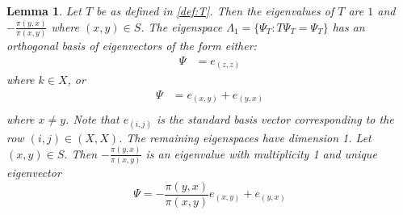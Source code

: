 \documentclass{amsart}
\newtheorem{lemma}[definition]{Lemma}
\newcommand{\1}{\mathbbm{1}}
\begin{document}
\begin{lemma}\label{lem:eigen}
    Let $T$ be as defined in \ref{def:T}. Then the eigenvalues of $T$ are $1$ and $-\frac{\pi(y,x)}{\pi(x,y)}$ where $(x,y)\in S$. The eigenspace $\Lambda_1=\{\Psi_T: T\Psi_T=\Psi_T\}$ has an orthogonal basis of eigenvectors of the form either:
    \begin{align*}
        \Psi &= e_{(z,z)}
    \end{align*}
    where $k\in X$, or 
    \begin{align*}
        \Psi &= e_{(x,y)}+e_{(y,x)}\\
    \end{align*}
    where $x\neq y$. Note that $e_{(i,j)}$ is the standard basis vector corresponding to the row $(i,j)\in (X,X)$. The remaining eigenspaces have dimension 1. Let $(x,y)\in S$. Then $-\frac{\pi(y,x)}{\pi(x,y)}$ is an eigenvalue with multiplicity 1 and unique eigenvector
    \begin{equation*}
        \Psi=-\frac{\pi(y,x)}{\pi(x,y)}e_{(x,y)}+ e_{(y,x)}
    \end{equation*}
\end{lemma}
\end{document}
